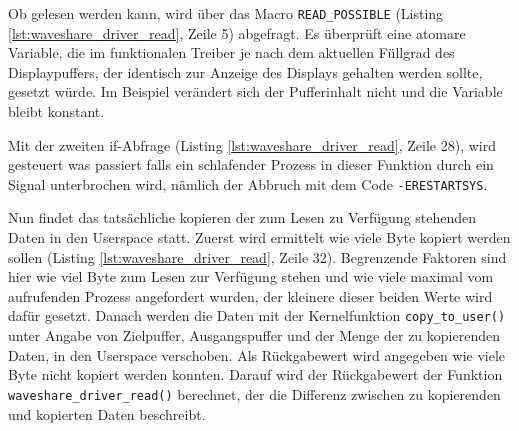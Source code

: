 Ob gelesen werden kann, wird über das Macro \texttt{READ\_POSSIBLE} (Listing \ref{lst:waveshare_driver_read}, Zeile 5) abgefragt. Es überprüft eine atomare Variable, die im funktionalen Treiber je nach dem aktuellen Füllgrad des Displaypuffers, der identisch zur Anzeige des Displays gehalten werden sollte, gesetzt würde. Im Beispiel verändert sich der Pufferinhalt nicht und die Variable bleibt konstant. 

Mit der zweiten if-Abfrage (Listing \ref{lst:waveshare_driver_read}, Zeile 28), wird gesteuert was passiert falls ein schlafender Prozess in dieser Funktion durch ein Signal unterbrochen wird, nämlich der Abbruch mit dem Code \texttt{-ERESTARTSYS}.

Nun findet das tatsächliche kopieren der zum Lesen zu Verfügung stehenden Daten in den Userspace statt. Zuerst wird ermittelt wie viele Byte kopiert werden sollen (Listing \ref{lst:waveshare_driver_read}, Zeile 32). Begrenzende Faktoren sind hier wie viel Byte zum Lesen zur Verfügung stehen und wie viele maximal vom aufrufenden Prozess angefordert wurden, der kleinere dieser beiden Werte wird dafür gesetzt. Danach werden die Daten mit der Kernelfunktion \texttt{copy\_to\_user()} unter Angabe von Zielpuffer, Ausgangspuffer und der Menge der zu kopierenden Daten, in den Userspace verschoben. Als Rückgabewert wird angegeben wie viele Byte nicht kopiert werden konnten. Darauf wird der Rückgabewert der Funktion \texttt{waveshare_driver_read()} berechnet, der die Differenz zwischen zu kopierenden und kopierten Daten beschreibt.


